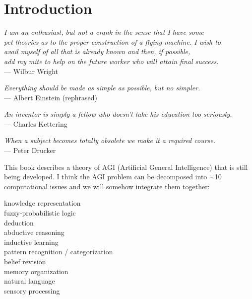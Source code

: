 \chapter{Introduction}
\begin{flushright}
\emph{I am an enthusiast, but not a crank in the sense that I have some\\
pet theories as to the proper construction of a flying machine. I wish to\\
avail myself of all that is already known and then, if possible,\\
add my mite to help on the future worker who will attain final success.}\\
--- Wilbur Wright
\end{flushright}

\begin{flushright}
\emph{Everything should be made as simple as possible, but no simpler.}\\
--- Albert Einstein (rephrased)
\end{flushright}

\begin{flushright}
\emph{An inventor is simply a fellow who doesn't take his education too seriously.}\\
--- Charles Kettering 
\end{flushright}

\begin{flushright}
\emph{When a subject becomes totally obsolete we make it a required course.}\\
--- Peter Drucker
\end{flushright}

\minitoc

This book describes a theory of AGI (Artificial General Intelligence) \citep*{Goertzel2007} that is still being developed.  I think the AGI problem can be decomposed into $\sim$10 computational issues and we will somehow integrate them together:

\leftskip 1cm
knowledge representation\\
fuzzy-probabilistic logic\\
deduction\\
abductive reasoning\\
inductive learning\\
pattern recognition / categorization\\
belief revision\\
memory organization\\
natural language\\
sensory processing

